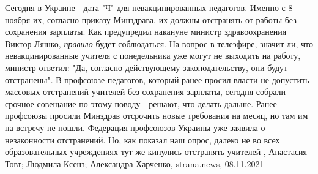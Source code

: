 Сегодня в Украине - дата "Ч" для невакцинированных педагогов.  Именно с 8 ноября
их, согласно приказу Минздрава, их должны отстранять от работы без сохранения
зарплаты.  Как предупредил накануне министр здравоохранения Виктор Ляшко,
\emph{правило} будет соблюдаться. На вопрос в телеэфире, значит ли, что
невакцинированные учителя с понедельника уже могут не выходить на работу,
министр ответил: "Да, согласно действующему законодательству, они будут
отстранены". В профсоюзе педагогов, который ранее просил власти не допустить
массовых отстранений учителей без сохранения зарплаты, сегодня собрали срочное
совещание по этому поводу - решают, что делать дальше. Ранее профсоюзы просили
Минздрав отсрочить новые требования на месяц, но там им на встречу не пошли.
Федерация профсоюзов Украины уже заявила о незаконности отстранений.  Но, как
показал наш опрос, далеко не во всех образовательных учреждениях тут же
кинулись отстранять учителей
, 
Анастасия Товт; Людмила Ксенз; Александра Харченко, strana.news, 08.11.2021
